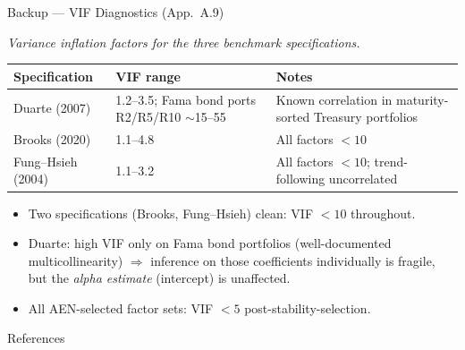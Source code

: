 \documentclass[aspectratio=169,11pt]{beamer}
\begin{document}
\begin{frame}[t]{Backup --- VIF Diagnostics (App.\ A.9)}
\centering
\scriptsize
\vspace{0.10cm}

\textit{Variance inflation factors for the three benchmark specifications.}

\vspace{0.30cm}
\renewcommand{\arraystretch}{1.20}
\setlength{\tabcolsep}{6pt}

\begin{tabular}{p{2.5cm}p{4.8cm}p{6.0cm}}
\toprule
Specification              & VIF range          & Notes \\
\midrule
Duarte (2007)              & 1.2--3.5; Fama bond ports R2/R5/R10 $\sim$15--55 & Known correlation in maturity-sorted Treasury portfolios \\
Brooks (2020)              & 1.1--4.8           & All factors $<10$ \\
Fung--Hsieh (2004)         & 1.1--3.2           & All factors $<10$; trend-following uncorrelated \\
\bottomrule
\end{tabular}

\vspace{0.40cm}

\begin{itemize}\itemsep=0.06cm\footnotesize
  \item Two specifications (Brooks, Fung--Hsieh) clean: VIF $<10$ throughout.
  \item Duarte: high VIF only on Fama bond portfolios (well-documented multicollinearity)
        $\Rightarrow$ inference on those coefficients individually is fragile, but the
        \emph{alpha estimate} (intercept) is unaffected.
  \item All AEN-selected factor sets: VIF $<5$ post-stability-selection.
\end{itemize}

\end{frame}

\begin{frame}[allowframebreaks]{References}
\scriptsize

\end{frame}
\end{document}
